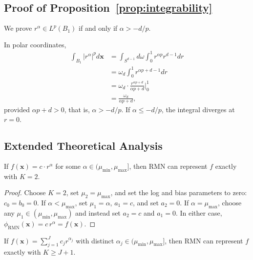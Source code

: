 \documentclass[twoside,11pt]{article}
\newcommand{\bx}{\bm{x}}
\begin{document}
\subsection{Proof of Proposition~\ref{prop:integrability}}

We prove $r^\alpha \in L^p(B_1)$ if and only if $\alpha > -d/p$.

In polar coordinates,
\begin{align}
	\int_{B_1} |r^\alpha|^p d\bx & = \int_{S^{d-1}} d\omega \int_0^1 r^{\alpha p} r^{d-1} dr        \\
	                             & = \omega_d \int_0^1 r^{\alpha p + d - 1} dr                      \\
	                             & = \omega_d \cdot \frac{r^{\alpha p + d}}{\alpha p + d} \Big|_0^1 \\
	                             & = \frac{\omega_d}{\alpha p + d},
\end{align}
provided $\alpha p + d > 0$, that is, $\alpha > -d/p$. If $\alpha \leq -d/p$, the integral diverges at $r = 0$.

\subsection{Extended Theoretical Analysis}
\label{app:moved_statements}

\begin{proposition}
	If $f(\bx) = c \cdot r^\alpha$ for some $\alpha \in (\mu_{\min}, \mu_{\max}]$, then RMN can represent $f$ exactly with $K = 2$.
\end{proposition}

\begin{proof}
	Choose $K=2$, set $\mu_2=\mu_{\max}$, and set the log and bias parameters to zero: $c_0=b_0=0$.
	If $\alpha<\mu_{\max}$, set $\mu_1=\alpha$, $a_1=c$, and set $a_2=0$.
	If $\alpha=\mu_{\max}$, choose any $\mu_1\in(\mu_{\min},\mu_{\max})$ and instead set $a_2=c$ and $a_1=0$.
	In either case, $\phi_{\text{RMN}}(\bx)=c\,r^\alpha=f(\bx)$.
\end{proof}

\begin{proposition}
	If $f(\bx) = \sum_{j=1}^J c_j r^{\alpha_j}$ with distinct $\alpha_j \in (\mu_{\min}, \mu_{\max}]$, then RMN can represent $f$ exactly with $K \geq J+1$.
\end{proposition}
\end{document}
